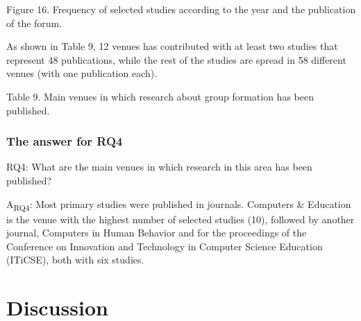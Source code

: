 Figure 16. Frequency of selected studies according to the year and the publication of the forum.

As shown in Table 9, 12 venues has contributed with at least two studies that represent 48 publications, while the rest of the studies are spread in 58 different venues (with one publication each). 

Table 9. Main venues in which research about group formation has been published.

\subsubsection{The answer for RQ4}

RQ4: What are the main venues in which research in this area has been published?

A\textsubscript{RQ4}: Most primary studies were published in journals. Computers \& Education is the venue with the highest number of selected studies (10), followed by another journal, Computers in Human Behavior and for the proceedings of the Conference on Innovation and Technology in Computer Science Education (ITiCSE), both with six studies. 

\section{Discussion}

